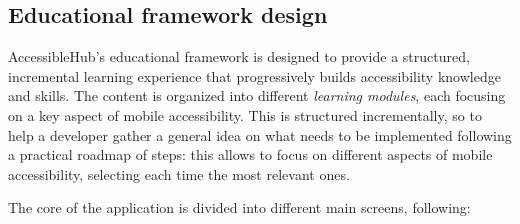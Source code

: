\subsection{Educational framework design}

AccessibleHub's educational framework is designed to provide a structured, incremental learning experience that progressively builds accessibility knowledge and skills. The content is organized into different \textit{learning modules}, each focusing on a key aspect of mobile accessibility. This is structured incrementally, so to help a developer gather a general idea on what needs to be implemented following a practical roadmap of steps: this allows to focus on different aspects of mobile accessibility, selecting each time the most relevant ones.

The core of the application is divided into different main screens, following:

